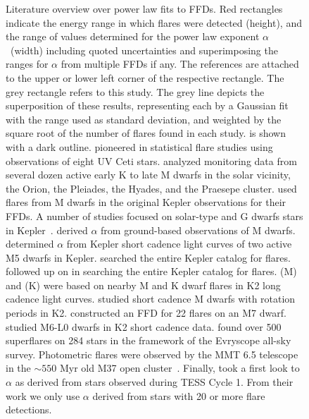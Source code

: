 \documentclass{aa}
\begin{document}
\begin{appendix}
\begin{figure}[ht!]
         \caption{Literature overview over power law fits to FFDs. Red rectangles indicate the energy range in which flares were detected (height), and the range of values determined for the power law exponent $\alpha$~(width) including quoted uncertainties and superimposing the ranges for $\alpha$ from multiple FFDs if any. The references are attached to the upper or lower left corner of the respective rectangle. The grey rectangle refers to this study. The grey line depicts the superposition of these results, representing each by a Gaussian fit with the range used as standard deviation, and weighted by the square root of the number of flares found in each study.  is shown with a dark outline. \citet{lacy_uv_1976} pioneered in statistical flare studies using observations of eight UV Ceti stars. \citet{shakhovskaya_stellar_1989} analyzed monitoring data from several dozen active early K to late M dwarfs in the solar vicinity, the Orion, the Pleiades, the Hyades, and the Praesepe cluster. \citet{hawley_kepler_2014} used flares from M dwarfs in the original Kepler observations for their FFDs. A number of studies focused on solar-type and G dwarfs stars in Kepler~\citep{maehara2012,wu2015,shibayama2013}. \citet{hilton2011} derived $\alpha$ from ground-based observations of M dwarfs. \citet{lurie2015} determined $\alpha$ from Kepler short cadence light curves of two active M5 dwarfs in Kepler. \citet{davenport_kepler_2016} searched the entire Kepler catalog for flares. \citet{yang_flaring_2017} followed up on \citet{davenport_kepler_2016} in searching the entire Kepler catalog for flares. \citet{lin2019} (M) and (K) were based on nearby M and K dwarf flares in K2 long cadence light curves. \citep{raetz2020} studied short cadence M dwarfs with rotation periods in K2. \citet{gizis_k2_2017-1} constructed an FFD for 22 flares on an M7 dwarf. \citet{paudel2018} studied M6-L0 dwarfs in K2 short cadence data. \citet{howard2019} found over 500 superflares on 284 stars in the framework of the Evryscope all-sky survey. Photometric flares were observed by the MMT 6.5 telescope~\citep{hartman2008} in the $\sim550$ Myr old M37 open cluster~\citep{chang2015}. Finally, \citep{guenther2020} took a first look to $\alpha$ as derived from stars observed during TESS Cycle 1. From their work we only use $\alpha$ derived from stars with 20 or more flare detections.
}
          \label{fig:app:powerlaw_literature}
     
   \end{figure}
\end{appendix}
\end{document}
